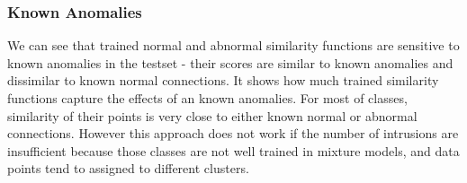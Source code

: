 \subsubsection{Known Anomalies}
We can see that trained normal and abnormal similarity functions are sensitive to known anomalies in the testset - their scores are similar to known anomalies and dissimilar to known normal connections. 
It shows how much trained similarity functions capture the effects of an known anomalies. 
For most of classes, similarity of their points is very close to either known normal or abnormal connections. 
However this approach does not work if the number of intrusions are insufficient because those classes are not well trained in mixture models, and data points tend to assigned to different clusters. 

